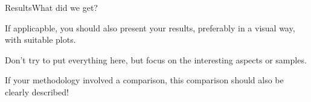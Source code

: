 \begin{frame}[t]{Results}{What did we get?}

  If applicapble, you should also present your results, preferably in
  a visual way, with suitable plots.

  Don't try to put everything here, but focus on the interesting
  aspects or samples.

  If your methodology involved a comparison, this comparison should
  also be clearly described!

\end{frame}
